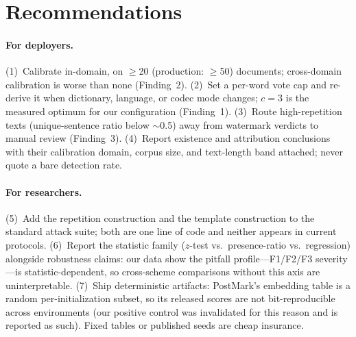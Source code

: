 \section{Recommendations}
\label{sec:recs}

\paragraph{For deployers.}
(1)~Calibrate in-domain, on $\ge$20 (production: $\ge$50) documents;
cross-domain calibration is worse than none (Finding~2).
(2)~Set a per-word vote cap and re-derive it when dictionary, language, or
codec mode changes; $c{=}3$ is the measured optimum for our configuration
(Finding~1). (3)~Route high-repetition texts (unique-sentence ratio below
$\sim$0.5) away from watermark verdicts to manual review (Finding~3).
(4)~Report existence and attribution conclusions with their calibration
domain, corpus size, and text-length band attached; never quote a bare
detection rate.

\paragraph{For researchers.}
(5)~Add the repetition construction and the template construction to the
standard attack suite; both are one line of code and neither appears in
current protocols. (6)~Report the statistic family ($z$-test vs.\
presence-ratio vs.\ regression) alongside robustness claims: our data show
the pitfall profile---F1/F2/F3 severity---is statistic-dependent, so
cross-scheme comparisons without this axis are uninterpretable.
(7)~Ship deterministic artifacts: PostMark's embedding table is a random
per-initialization subset, so its released scores are not bit-reproducible
across environments (our positive control was invalidated for this reason
and is reported as such). Fixed tables or published seeds are cheap
insurance.
